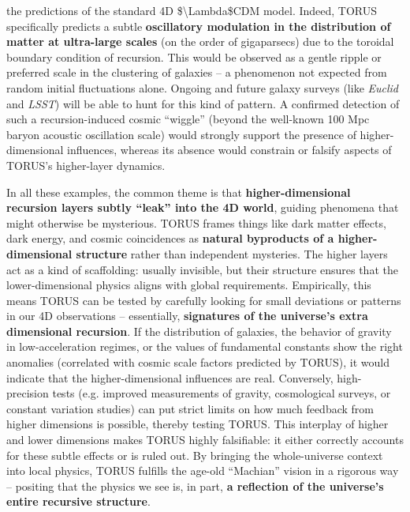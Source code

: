 \documentclass[
]{article}
\begin{document}
\begin{itemize}
  the predictions of the standard 4D \$\textbackslash Lambda\$CDM model.
  Indeed, TORUS specifically predicts a subtle \textbf{oscillatory
  modulation in the distribution of matter at ultra-large scales} (on
  the order of gigaparsecs) due to the toroidal boundary condition of
  recursion\hspace{0pt}. This would be observed as a gentle ripple or
  preferred scale in the clustering of galaxies -- a phenomenon not
  expected from random initial fluctuations alone. Ongoing and future
  galaxy surveys (like \emph{Euclid} and \emph{LSST}) will be able to
  hunt for this kind of pattern\hspace{0pt}. A confirmed detection of
  such a recursion-induced cosmic ``wiggle'' (beyond the well-known 100
  Mpc baryon acoustic oscillation scale) would strongly support the
  presence of higher-dimensional influences, whereas its absence would
  constrain or falsify aspects of TORUS's higher-layer dynamics.
\end{itemize}

In all these examples, the common theme is that
\textbf{higher-dimensional recursion layers subtly ``leak'' into the 4D
world}, guiding phenomena that might otherwise be mysterious. TORUS
frames things like dark matter effects, dark energy, and cosmic
coincidences as \textbf{natural byproducts of a higher-dimensional
structure} rather than independent mysteries. The higher layers act as a
kind of scaffolding: usually invisible, but their structure ensures that
the lower-dimensional physics aligns with global requirements.
Empirically, this means TORUS can be tested by carefully looking for
small deviations or patterns in our 4D observations -- essentially,
\textbf{signatures of the universe's extra dimensional recursion}. If
the distribution of galaxies, the behavior of gravity in
low-acceleration regimes, or the values of fundamental constants show
the right anomalies (correlated with cosmic scale factors predicted by
TORUS), it would indicate that the higher-dimensional influences are
real. Conversely, high-precision tests (e.g. improved measurements of
gravity, cosmological surveys, or constant variation studies) can put
strict limits on how much feedback from higher dimensions is possible,
thereby testing TORUS. This interplay of higher and lower dimensions
makes TORUS highly falsifiable: it either correctly accounts for these
subtle effects or is ruled out. By bringing the whole-universe context
into local physics, TORUS fulfills the age-old ``Machian'' vision in a
rigorous way -- positing that the physics we see is, in part, \textbf{a
reflection of the universe's entire recursive structure}.
\end{document}
